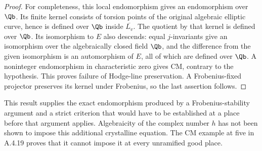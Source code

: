 \begin{proof}
For completeness, this local endomorphism gives an endomorphism over $\Qb$. Its finite kernel consists of torsion points of the original algebraic elliptic curve, hence is defined over $\Qb$ inside $\overline{L_v}$. The quotient by that kernel is defined over $\Qb$. Its isomorphism to $E$ also descends: equal $j$-invariants give an isomorphism over the algebraically closed field $\Qb$, and the difference from the given isomorphism is an automorphism of $E$, all of which are defined over $\Qb$. A noninteger endomorphism in characteristic zero gives CM, contrary to the hypothesis. This proves failure of Hodge-line preservation. A Frobenius-fixed projector preserves its kernel under Frobenius, so the last assertion follows.
\end{proof}

This result supplies the exact endomorphism produced by a Frobenius-stability argument and a strict criterion that would have to be established at a place before that argument applies. Algebraicity of the complex number $h$ has not been shown to impose this additional crystalline equation. The CM example at five in A.4.19 proves that it cannot impose it at every unramified good place.

